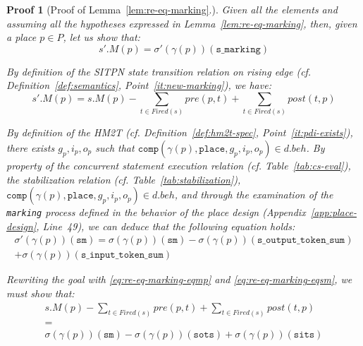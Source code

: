 \documentclass[pdflatex,sn-mathphys]{sn-jnl}%
\theoremstyle{thmstyleone}%
\theoremstyle{thmstyletwo}%
\newtheorem*{pf}{Proof}%
\theoremstyle{thmstylethree}%
\begin{document}
\begin{pf}[Proof of Lemma~\ref{lem:re-eq-marking}.]
  Given all the elements and assuming all the hypotheses expressed in
  Lemma~\ref{lem:re-eq-marking}, then, given a place $p\in{}P$, let us
  show that:
  \begin{equation*}
    \boxed{s'.M(p)=\sigma'(\gamma(p))(\texttt{s\_marking})}
  \end{equation*}

  By definition of the SITPN state transition relation on rising edge
  (cf. Definition~\ref{def:semantics}, Point~\ref{it:new-marking}), we
  have:
  \begin{equation}\label{eq:re-eq-marking-eqmp}
    s'.M(p)=s.M(p)-\sum\limits_{t\in{}Fired(s)}pre(p,t)+\sum\limits_{t\in{}Fired(s)}post(t,p)
  \end{equation}

  \bigskip
  
  By definition of the HM2T (cf. Definition~\ref{def:hm2t-spec},
  Point~\ref{it:pdi-exists}), there exists $g_p,i_p,o_p$ such that
  $\mathtt{comp}(\gamma(p),\mathtt{place},g_p,i_p,o_p)\in{}d.beh$.  By
  property of the \hvhdl{} concurrent statement execution relation
  (cf. Table~\ref{tab:cs-eval}), the stabilization relation
  (cf. Table~\ref{tab:stabilization}),
  $\mathtt{comp}(\gamma(p),\mathtt{place},g_p,i_p,o_p)\in{}d.beh$, and
  through the examination of the \texttt{marking} process defined in
  the behavior of the place design (Appendix~\ref{app:place-design},
  Line~49), we can deduce that the following equation holds:
  \begin{equation}\label{eq:re-eq-marking-eqsm}
    \begin{split}
      \sigma'(\gamma(p))(\texttt{sm})=\sigma(\gamma(p))(\texttt{sm})-\sigma(\gamma(p))(\texttt{s\_output\_token\_sum})\\
      +\sigma(\gamma(p))(\texttt{s\_input\_token\_sum})
    \end{split}
  \end{equation}

  \bigskip
  
  \noindent{}Rewriting the goal with \eqref{eq:re-eq-marking-eqmp} and
  \eqref{eq:re-eq-marking-eqsm}, we must show that:
  \begin{equation*}
    \boxed{
      \begin{array}{c}
      s.M(p)-\sum\limits_{t\in{}Fired(s)}pre(p,t)+\sum\limits_{t\in{}Fired(s)}post(t,p)\\
      = \\
      \sigma(\gamma(p))(\texttt{sm})-\sigma(\gamma(p))(\texttt{sots})
      +\sigma(\gamma(p))(\texttt{sits}) \\
      \end{array}}
  \end{equation*}
  

\end{pf}
\end{document}
